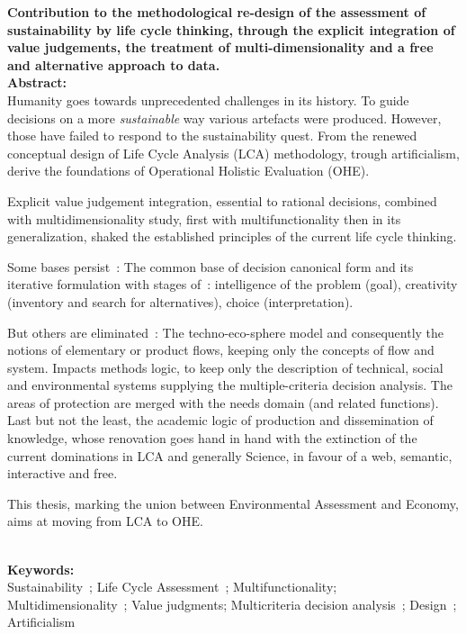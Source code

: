 {\large \bfseries
Contribution to the methodological re-design of the assessment of sustainability by life cycle thinking, through the explicit integration of value judgements, the treatment of multi-dimensionality and a free and alternative approach to data.
}
~\\

\textbf{Abstract:}\\
Humanity goes towards unprecedented challenges in its history.
To guide decisions on a more \emph{sustainable} way various artefacts were produced.
However, those have failed to respond to the sustainability quest.
From the renewed conceptual design of Life Cycle Analysis (LCA) methodology, trough artificialism, derive the foundations of Operational Holistic Evaluation (OHE).

Explicit value judgement integration, essential to rational decisions, combined with multidimensionality study, first with multifunctionality then in its generalization, shaked the established principles of the current life cycle thinking.

Some bases persist~:
The common base of decision canonical form and its iterative formulation with stages of~: intelligence of the problem (goal), creativity (inventory and search for alternatives), choice (interpretation).

But others are eliminated~:
The techno-eco-sphere model and consequently the notions of elementary or product flows, keeping only the concepts of flow and system.
Impacts methods logic, to keep only the description of technical, social and environmental systems supplying the multiple-criteria decision analysis.
The areas of protection are merged with the needs domain (and related functions).
Last but not the least, the academic logic of production and dissemination of knowledge, whose renovation goes hand in hand with the extinction of the current dominations in LCA and generally Science, in favour of a web, semantic, interactive and free.

This thesis, marking the union between Environmental Assessment and Economy, aims at moving from LCA to OHE.

~\\
\textbf{Keywords:}\\
Sustainability~; Life Cycle Assessment~; Multifunctionality; ~ Multidimensionality~; Value judgments; Multicriteria decision analysis~; Design~; Artificialism
\newpage